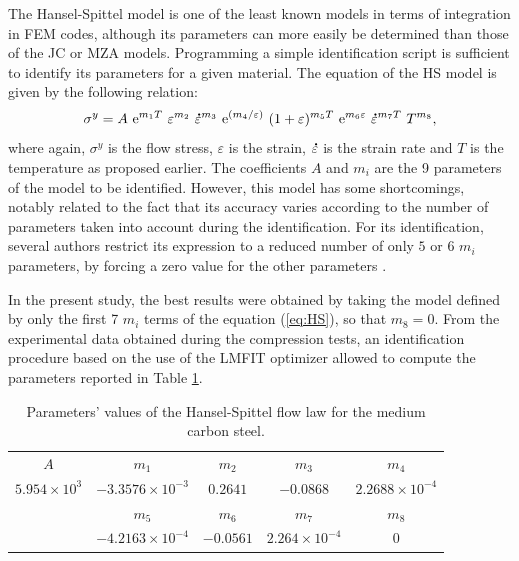 \documentclass[twoside,english,1p,final,sort&compress]{elsarticle}
\theoremstyle{plain}
\DeclareRobustCommand{\e}[1]{{\rm e}^{#1}}
\DeclareRobustCommand{\mdot}[1]{\accentset{\mbox{\bfseries .}}{#1}}
\begin{document}
The Hansel-Spittel model \cite{Hensel-1978} is one of the least known models in terms of integration in FEM codes, although its parameters can more easily be determined than those of the JC or MZA models.
Programming a simple identification script is sufficient to identify its parameters for a given material.
The equation of the HS model is given by the following relation:
\begin{equation}
\sigma^y = A~\e{m_1T}~\varepsilon^{m_2}~\mdot\varepsilon^{m_3}~\e{({m_4}/{\varepsilon})}~(1+\varepsilon)^{m_5T}~\e{m_6\varepsilon}~\mdot\varepsilon^{m_7T}~T^{m_8}, \label{eq:HS}
\end{equation}
where again, $\sigma^y$ is the flow stress, $\varepsilon$ is the strain, $\mdot\varepsilon$ is the strain rate and $T$ is the temperature as proposed earlier.
The coefficients $A$ and $m_i$ are the 9 parameters of the model to be identified.
However, this model has some shortcomings, notably related to the fact that its accuracy varies according to the number of parameters taken into account during the identification.
For its identification, several authors restrict its expression to a reduced number of only $5$ or $6$ $m_i$ parameters, by forcing a zero value for the other parameters \cite{Chadha-2018, Mehtedi-2015, Rudnytskyj-2020}.

In the present study, the best results were obtained by taking the model defined by only the first 7 $m_i$ terms of the equation (\ref{eq:HS}), so that $m_8=0$.
From the experimental data obtained during the compression tests, an identification procedure based on the use of the LMFIT optimizer \cite{Newville-2016} allowed to compute the parameters reported in Table 
 \ref{tab:HS}.

\begin{table}[h!]
\centering
\caption{Parameters' values of the Hansel-Spittel flow law for the medium carbon steel.}
\begin{tabular}{ccccc}
	\hline
	        $A$          &         $m_1$          &   $m_2$   &        $m_3$         &         $m_4$         \\
	$5.954\times 10^{3}$ & $-3.3576\times10^{-3}$ & $0.2641$  &      $-0.0868$       & $2.2688\times10^{-4}$ \\ \hline
	                     &         $m_5$          &   $m_6$   &        $m_7$         &         $m_8$         \\
	                     & $-4.2163\times10^{-4}$ & $-0.0561$ & $2.264\times10^{-4}$ &          $0$          \\ \hline
\end{tabular}
\label{tab:HS}
\end{table}
\end{document}
